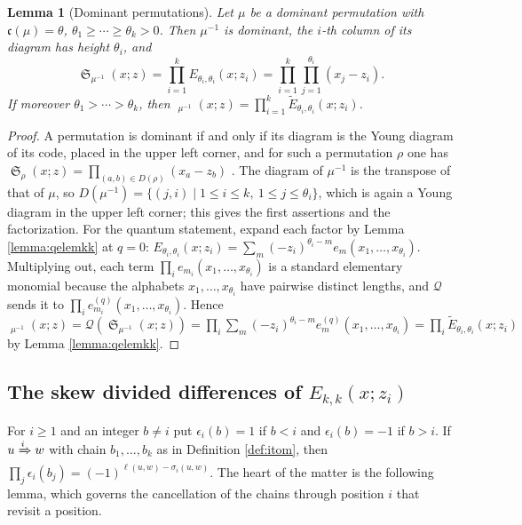 \documentclass{amsart}
\newtheorem{lemma}{Lemma}[section]
\theoremstyle{definition}
\theoremstyle{remark}
\numberwithin{equation}{section}
\DeclareMathOperator{\sch}{\mathfrak{S}}
\DeclareMathOperator{\qsch}{\widetilde{\mathfrak{S}}}
\newcommand{\code}{\mathfrak{c}}
\newcommand{\qelem}{\widetilde{E}}
\begin{document}
\begin{lemma}[Dominant permutations] \label{lemma:dominantfactor}
Let $\mu$ be a dominant permutation with $\code(\mu)=\theta$, $\theta_1\geq\cdots\geq\theta_k>0$. Then $\mu^{-1}$ is dominant, the $i$-th column of its diagram has height $\theta_i$, and
$$\sch_{\mu^{-1}}(x;z)=\prod_{i=1}^kE_{\theta_i,\theta_i}(x;z_i)=\prod_{i=1}^k\prod_{j=1}^{\theta_i}(x_j-z_i).$$
If moreover $\theta_1>\cdots>\theta_k$, then $\qsch_{\mu^{-1}}(x;z)=\prod_{i=1}^k\qelem_{\theta_i,\theta_i}(x;z_i)$.
\end{lemma}
\begin{proof}
A permutation is dominant if and only if its diagram is the Young diagram of its code, placed in the upper left corner, and for such a permutation $\rho$ one has $\sch_\rho(x;z)=\prod_{(a,b)\in D(\rho)}(x_a-z_b)$ \cite{notes}. The diagram of $\mu^{-1}$ is the transpose of that of $\mu$, so $D(\mu^{-1})=\{(j,i)\mid 1\leq i\leq k,\ 1\leq j\leq\theta_i\}$, which is again a Young diagram in the upper left corner; this gives the first assertions and the factorization. For the quantum statement, expand each factor by Lemma \ref{lemma:qelemkk} at $q=0$: $E_{\theta_i,\theta_i}(x;z_i)=\sum_{m}(-z_i)^{\theta_i-m}e_m(x_1,\ldots,x_{\theta_i})$. Multiplying out, each term $\prod_ie_{m_i}(x_1,\ldots,x_{\theta_i})$ is a standard elementary monomial because the alphabets $x_1,\ldots,x_{\theta_i}$ have pairwise distinct lengths, and $\mathcal Q$ sends it to $\prod_ie^{(q)}_{m_i}(x_1,\ldots,x_{\theta_i})$. Hence $\qsch_{\mu^{-1}}(x;z)=\mathcal Q(\sch_{\mu^{-1}}(x;z))=\prod_i\sum_m(-z_i)^{\theta_i-m}e^{(q)}_m(x_1,\ldots,x_{\theta_i})=\prod_i\qelem_{\theta_i,\theta_i}(x;z_i)$ by Lemma \ref{lemma:qelemkk}.
\end{proof}

\subsection{The skew divided differences of $E_{k,k}(x;z_i)$}

For $i\geq1$ and an integer $b\neq i$ put $\epsilon_i(b)=1$ if $b<i$ and $\epsilon_i(b)=-1$ if $b>i$. If $u\xRightarrow{i}w$ with chain $b_1,\ldots,b_k$ as in Definition \ref{def:itom}, then $\prod_j\epsilon_i(b_j)=(-1)^{\ell(u,w)-\sigma_i(u,w)}$. The heart of the matter is the following lemma, which governs the cancellation of the chains through position $i$ that revisit a position.
\end{document}

